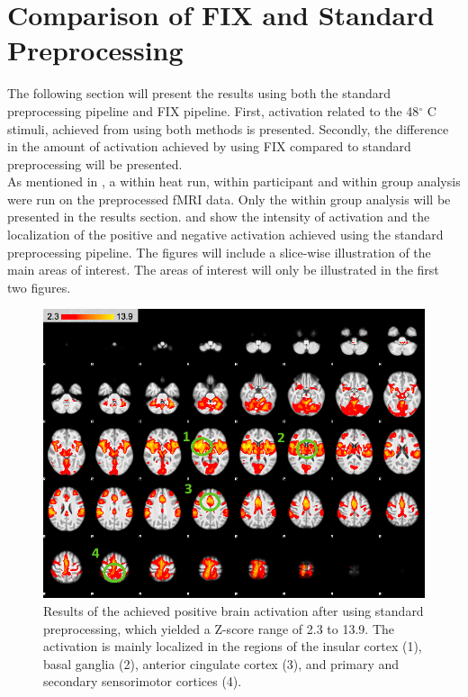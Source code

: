 \section{Comparison of FIX and Standard Preprocessing}\label{sec:comp}

The following section will present the results using both the standard preprocessing pipeline and FIX pipeline. First, activation related to the 48$^\circ$ C stimuli, achieved from using both methods is presented. Secondly, the difference in the amount of activation achieved by using FIX compared to standard preprocessing will be presented. \\
As mentioned in , a within heat run, within participant and within group analysis were run on the preprocessed fMRI data. Only the within group analysis will be presented in the results section.  and  show the intensity of activation and the localization of the positive and negative activation achieved using the standard preprocessing pipeline. The figures will include a slice-wise illustration of the main areas of interest. The areas of interest will only be illustrated in the first two figures.     


\begin{figure}[H]                 
	\includegraphics[width=.65\textwidth]{figures/Results/STD_pos_1}  
	\caption{Results of the achieved positive brain activation after using standard preprocessing, which yielded a Z-score range of 2.3 to 13.9. The activation is mainly localized in the regions of the insular cortex (1), basal ganglia (2), anterior cingulate cortex (3), and primary and secondary sensorimotor cortices (4).}
	\label{fig:res:stdpos} 
\end{figure}

